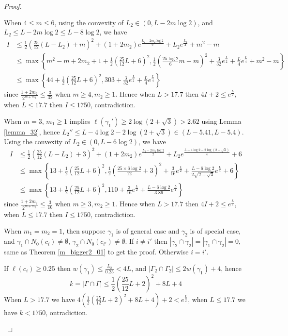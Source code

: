 \documentclass[10pt,a4paper]{amsart}
\newcommand{\abs}[1]{\left| #1 \right|}
\newcommand{\bracket}[1]{\left( #1 \right)}
\begin{document}
\begin{proof}
\begin{enumerate}
When $4\leqslant m\leqslant6$, using the convexity of $L_2\in(0,L-2m\log2)$, and $L_2\leqslant L-2m\log2\leqslant L-8\log2$, we have
\begin{align*}
 I&\leqslant\frac12\bracket{\frac{25}{12}(L-L_2)+m}^2+(1+2m_2)e^{\frac{L_2-2m_2\log2}2}+{L_2}e^{\frac{L_2}4}+m^2-m\\
&\leqslant\max\left\{m^2-m+2m_2+1+\frac12\bracket{\frac{25}{12}L+6}^2, \frac12\bracket{\frac{25\log2}{6}m+m}^2+\frac{3}{32}e^{\frac{L}{2}}+\frac{L}{4}e^{\frac{L}4}+m^2-m\right\}\\
&\leqslant\max\left\{44+\frac12\bracket{\frac{25}{12}L+6}^2, 303+\frac{3}{32}e^{\frac{L}{2}}+\frac{L}{4}e^{\frac{L}4}\right\}
\end{align*}
since $\frac{1+2m_2}{2^{m+m_2}}\leqslant\frac3{32}$ when $m\geqslant4, m_2\geqslant1$. Hence when $L>17.7$ then $4I+2\leqslant e^{\frac{L}2}$, when $L\leqslant17.7$ then $I\leqslant1750$, contradiction.

When $m=3$, $m_1\geqslant1$ implies $\ell(\gamma_1')\geqslant2\log(2+\sqrt3)>2.62$ using Lemma \ref{lemma_32}, hence $L_2''\leqslant L-4\log2-2\log(2+\sqrt3)\in(L-5.41,L-5.4)$. Using the convexity of $L_2\in(0,L-6\log2)$, we have
\begin{align*}
 I&\leqslant\frac12\bracket{\frac{25}{12}(L-L_2)+3}^2+(1+2m_2)e^{\frac{L_2-2m_2\log2}{2}}+{L_2}e^{\frac{L-4\log2-2\log(2+\sqrt3)}4}+6\\
&\leqslant\max\left\{13+\frac12\bracket{\frac{25}{12}L+6}^2,\frac12\bracket{\frac{25\times6\log2}{12}+3}^2+\frac{3}{16}e^{\frac{L}{2}}+\frac{L-6\log2}{2\sqrt{2+\sqrt3}}e^{\frac{L}4}+6\right\}\\
&\leqslant\max\left\{13+\frac12\bracket{\frac{25}{12}L+6}^2, 110+\frac{3}{16}e^{\frac{L}{2}}+\frac{L-6\log2}{3.86}e^{\frac{L}4}\right\}
\end{align*}
since $\frac{1+2m_2}{2^{m+m_2}}\leqslant\frac3{16}$ when $m\geqslant3, m_2\geqslant1$. Hence when $L>17.7$ then $4I+2\leqslant e^{\frac{L}2}$, when $L\leqslant17.7$ then $I\leqslant1750$, contradiction.




When $m_1=m_2=1$, then suppose $\gamma_1$ is of general case and $\gamma_2$ is of special case, and $\gamma_1\cap N_0(c_i)\neq\emptyset$, $\gamma_2\cap N_0(c_{i'})\neq\emptyset$. If $i\neq i'$ then $\abs{\gamma_2\cap\gamma_2}=\abs{\gamma_1\cap\gamma_2}=0$, same as Theorem \ref{m_bigger2_01} to get the proof. Otherwise $i=i'$. 

If $\ell(c_i)\geqslant 0.25$ then $w(\gamma_1)\leqslant\frac{L_2}{0.25}<4L$, and $\abs{\Gamma_2\cap\Gamma_2}\leqslant2w(\gamma_1)+4$, hence 
$$k=\abs{\Gamma\cap\Gamma}\leqslant\frac12\bracket{\frac{25}{12}L+2}^2+8L+4$$ 
When $L>17.7$ we have $4(\frac12\bracket{\frac{25}{12}L+2}^2+8L+4)+2<e^{\frac{L}2}$, when $L\leqslant17.7$ we have $k<1750$, ontradiction.


\end{enumerate}
\end{proof}
\end{document}
